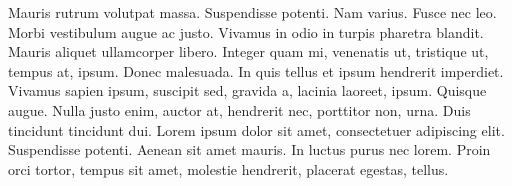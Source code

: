 Mauris rutrum volutpat massa. Suspendisse potenti. Nam varius. Fusce nec leo. Morbi vestibulum augue ac justo. Vivamus in odio in turpis pharetra blandit. Mauris aliquet ullamcorper libero. Integer quam mi, venenatis ut, tristique ut, tempus at, ipsum. Donec malesuada. In quis tellus et ipsum hendrerit imperdiet. Vivamus sapien ipsum, suscipit sed, gravida a, lacinia laoreet, ipsum. Quisque augue. Nulla justo enim, auctor at, hendrerit nec, porttitor non, urna. Duis tincidunt tincidunt dui. Lorem ipsum dolor sit amet, consectetuer adipiscing elit. Suspendisse potenti. Aenean sit amet mauris. In luctus purus nec lorem. Proin orci tortor, tempus sit amet, molestie hendrerit, placerat egestas, tellus.

